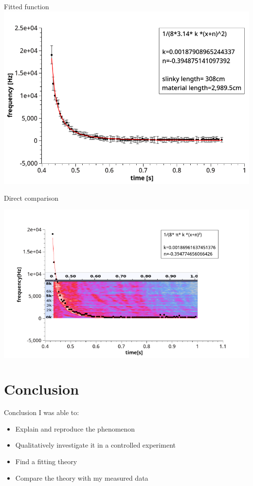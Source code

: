 \documentclass{beamer}
\begin{document}
	\begin{frame}{Fitted function}
		\includegraphics [scale=0.38]{images/legend_and_errors.png}
		
	\end{frame}
	
	\begin{frame}{Direct comparison}
		\begin{center}
			\includegraphics [scale=0.58]{images/comparison.png}
		\end{center}		
	\end{frame}

\section {Conclusion}
	\begin{frame}{Conclusion}
		I was able to:
		\begin{itemize}
		\item
		Explain and reproduce the phenomenon
		\item
		Qualitatively investigate it in a controlled experiment
		\item
		Find a fitting theory 
		\item
		Compare the theory with my measured data
		\end{itemize}
	\end{frame}
\end{document}
